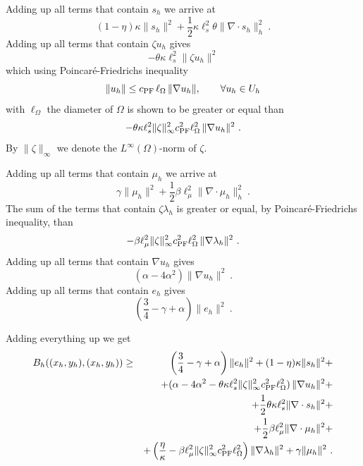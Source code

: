 \documentclass{article}
\begin{document}
Adding up all terms that contain $s_h$ we arrive at
\begin{equation}
(1-\eta) \kappa \|s_h\|^2 + \frac12 \kappa \ell_s^2 
 \theta  \|\nabla\cdot s_h\|_h^2~.
\label{eq:term1}
\end{equation}
Adding up all terms that contain $\zeta u_h$ gives
$$
-\theta \kappa \ell_s^2 \|\zeta u_h\|^2
$$
which using Poincar\'e-Friedrichs inequality
\begin{equation}
\|u_h\| \leq c_{\mbox{\scriptsize{PF}}}\,\ell_{\Omega}\,\|\nabla u_h\|, \qquad \forall u_h\in U_h
\label{eq:poincare}
\end{equation}
with $\ell_{\Omega}$ the diameter of $\Omega$ is shown to be greater or equal than 
\begin{equation}
- {\theta \kappa \ell_s^2 \|\zeta\|_{\infty}^2 c_{\mbox{\scriptsize{PF}}}^2 \ell_{\Omega}^2}\,\|\nabla u_h \|^2~.
\label{eq:term2}
\end{equation}
By $\|\zeta\|_{\infty}$ we denote the $L^{\infty}(\Omega)$-norm of $\zeta$.

Adding up all terms that contain $\mu_h$ we arrive at
\begin{equation}
\gamma \|\mu_h\|^2 +\frac12 \beta\ell_{\mu}^2  \|\nabla \cdot \mu_h \|_h^2~.
\label{eq:term4}
\end{equation}
The sum of the terms that contain $\zeta \lambda_h$ is greater or equal, by Poincaré-Friedrichs inequality, than
\begin{equation}
- \beta \ell_{\mu}^2 \|\zeta\|_{\infty}^2 c_{\mbox{\scriptsize{PF}}}^2 \ell_{\Omega}^2\,\|\nabla \lambda_h \|^2~.
\label{eq:term5}
\end{equation}
Adding up all terms that contain $\nabla u_h$ gives
\begin{equation}
\left ( \alpha - 4 \alpha^2 \right )
\|\nabla u_h\|^2~.
\label{eq:term6}
\end{equation}
Adding up all terms that contain $e_h$ gives
\begin{equation}
\left ( \frac34-\gamma + \alpha \right ) \|e_h\|^2~.
\label{eq:term7}
\end{equation}

Adding everything up we get
\begin{eqnarray}
B_h((x_h,y_h),(x_h,y_h))&\geq& \left (\frac34 -\gamma+\alpha \right ) \|e_h\|^2 + (1-\eta)\kappa \|s_h\|^2 + \nonumber \\
& & + (\alpha - 4 \alpha^2 - \theta \kappa \ell_s^2 \|\zeta\|_{\infty}^2 c_{\mbox{\scriptsize{PF}}}^2 \ell_{\Omega}^2)\, \|\nabla u_h\|^2 + \nonumber \\
& & + \frac12 \theta \kappa \ell_s^2 \|\nabla \cdot s_h\|^2 + \nonumber \\
& & + \frac12 \beta \ell_{\mu}^2 \| \nabla \cdot \mu_h\|^2 + \nonumber \\
& & 
+ \left ( \frac{\eta}{\kappa}-\beta \ell_{\mu}^2 \|\zeta\|_{\infty}^2 c_{\mbox{\scriptsize{PF}}}^2 \ell_{\Omega}^2 \right ) \|\nabla \lambda_h\|^2 + \gamma \|\mu_h\|^2~.
\end{eqnarray}
\end{document}
